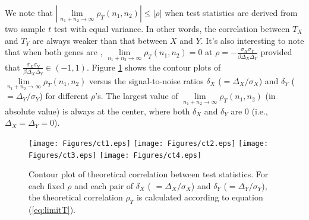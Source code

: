 %			

We note that $|\lim\limits_{n_1 + n_2 \rightarrow \infty} \rho_T(n_1, n_2)| \leq |\rho|$ when test 
statistics are derived from two sample $t$ test 
with equal variance. In other words, the correlation between $T_X$ and $T_Y$ are always weaker
 than that between $X$ 
and $Y$. It's also interesting to note that when both genes are \DED, $\lim\limits_{n_1 + n_2 
\rightarrow \infty} \rho_T(n_1, n_2)=0$ at $\rho 
=-\frac{\sigma_X\sigma_Y}{\beta\Delta_X\Delta_Y} $ provided that
$\frac{\sigma_X\sigma_Y}{\beta\Delta_X\Delta_Y} \in (-1, 1)$. Figure \ref{fig:ct} shows the 
contour plots of $\lim\limits_{n_1 + n_2 \rightarrow \infty} \rho_T(n_1, n_2)$ versus the 
signal-to-noise ratios $\delta_X$ ($=\Delta_X/\sigma_X$) 
and $\delta_Y$ ($=\Delta_Y/\sigma_Y$) for different $\rho$'s. The largest value of 
$\lim\limits_{n_1 + n_2 \rightarrow \infty} \rho_T(n_1, n_2)$ (in 
absolute value) 
is always at the center, where both $\delta_X$ and $\delta_Y$ are 0 (i.e., $\Delta_X =\Delta_Y 
= 0$).

\begin{figure}[!ht]
	\centering
	\texttt{[image: Figures/ct1.eps]}
	\texttt{[image: Figures/ct2.eps]}
	\texttt{[image: Figures/ct3.eps]}
	\texttt{[image: Figures/ct4.eps]}
	\caption[Contour plot of theoretical correlation between test statistics.]{Contour plot of 
		theoretical correlation between test statistics. For 
		each fixed $\rho$ and each pair of $\delta_X$ (	$=\Delta_X/\sigma_X$) 
		and $\delta_Y$ ($=\Delta_Y/\sigma_Y$), the theoretical correlation $\rho_T$ is 
		calculated according to equation (\ref{eq:limitT}).}
	\label{fig:ct}
\end{figure}

